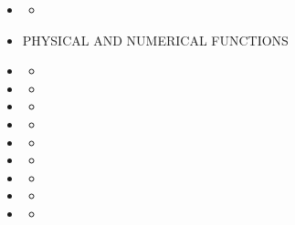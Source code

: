 \documentclass[11pt,a4paper]{article}
\begin{document}
\begin{itemize}
\begin{itemize}
			\item[] 		 
			\begin{itemize}
				\item[] 
			\end{itemize}		
		
		\item[] PHYSICAL AND NUMERICAL FUNCTIONS \\
		
			\item[] 		 
			\begin{itemize}
				\item[] 
			\end{itemize}
			
			\item[] 		 
			\begin{itemize}
				\item[] 
			\end{itemize}
			
			\item[] 		 
			\begin{itemize}
				\item[] 
			\end{itemize}
			
			\item[] 		 
			\begin{itemize}
				\item[] 
			\end{itemize}
			
			\item[] 		 
			\begin{itemize}
				\item[] 
			\end{itemize}
			
			\item[] 		 
			\begin{itemize}
				\item[] 
			\end{itemize}
			
			\item[] 		 
			\begin{itemize}
				\item[] 
			\end{itemize}
			
			\item[] 		 
			\begin{itemize}
				\item[] 
			\end{itemize}	
			
			\item[] 		 
			\begin{itemize}
				\item[] 
			\end{itemize}
			

\end{itemize}
\end{itemize}
\end{document}
